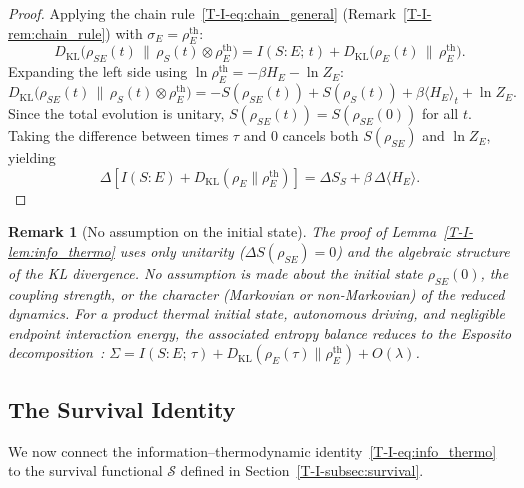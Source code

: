 \documentclass[12pt,a4paper,openany]{book}
\newtheorem{remark}[theorem]{Remark}
\begin{document}
\begin{proof}
Applying the chain rule~\eqref{T-I-eq:chain_general}
(Remark~\ref{T-I-rem:chain_rule}) with
$\sigma_E = \rho_E^{\mathrm{th}}$:
\begin{equation}
\label{T-I-eq:chain_step}
D_{\mathrm{KL}}\!\bigl(\rho_{SE}(t) \,\big\|\,
  \rho_S(t) \otimes \rho_E^{\mathrm{th}}\bigr)
= I(S{:}E;\, t)
  + D_{\mathrm{KL}}\!\bigl(\rho_E(t) \,\big\|\,
    \rho_E^{\mathrm{th}}\bigr).
\end{equation}
Expanding the left side using
$\ln\rho_E^{\mathrm{th}} = -\beta H_E - \ln Z_E$:
\begin{equation}
\label{T-I-eq:phi_expand}
D_{\mathrm{KL}}\!\bigl(\rho_{SE}(t) \,\big\|\,
  \rho_S(t) \otimes \rho_E^{\mathrm{th}}\bigr)
= -S(\rho_{SE}(t)) + S(\rho_S(t))
  + \beta\langle H_E \rangle_t + \ln Z_E.
\end{equation}
Since the total evolution is unitary,
$S(\rho_{SE}(t)) = S(\rho_{SE}(0))$ for all $t$.
Taking the difference between times $\tau$ and $0$ cancels
both $S(\rho_{SE})$ and $\ln Z_E$, yielding
\begin{equation}
\Delta\!\left[I(S{:}E)
  + D_{\mathrm{KL}}(\rho_E \| \rho_E^{\mathrm{th}})\right]
= \Delta S_S + \beta\,\Delta\langle H_E \rangle.
\end{equation}
\end{proof}

\begin{remark}[No assumption on the initial state]
\label{T-I-rem:no_product_lemma}
The proof of Lemma~\ref{T-I-lem:info_thermo} uses \emph{only}
unitarity ($\Delta S(\rho_{SE}) = 0$) and the algebraic
structure of the KL divergence.
No assumption is made about the initial state $\rho_{SE}(0)$,
the coupling strength, or the character (Markovian or
non-Markovian) of the reduced dynamics.
For a product thermal initial state, autonomous driving, and negligible
endpoint interaction energy, the associated entropy balance reduces to
the Esposito decomposition~\cite{EspositoLindenbergVandenBroeck2010}:
$\Sigma = I(S{:}E;\,\tau)
+ D_{\mathrm{KL}}(\rho_E(\tau) \| \rho_E^{\mathrm{th}})
+O(\lambda)$.
\end{remark}

\subsection{The Survival Identity}

We now connect the information--thermodynamic
identity~\eqref{T-I-eq:info_thermo} to the survival
functional $\mathcal{S}$ defined in
Section~\ref{T-I-subsec:survival}.
\end{document}
